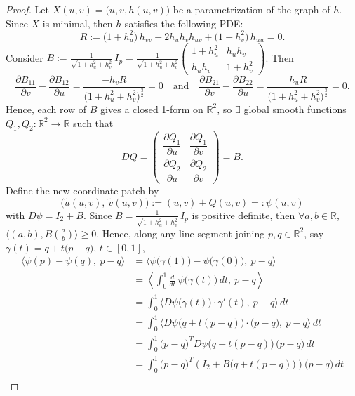 \begin{proof}
Let $X(u, v) = \big(u, v, h(u, v)\big)$ be a parametrization of the graph of $h$. Since $X$ is minimal, then $h$ satisfies the following PDE:
\[
R := \big(1 + h_u^2\big)\,h_{vv} - 2h_uh_vh_{uv} + \big(1 + h_v^2\big)\,h_{uu} = 0.
\]
Consider $B := \frac{1}{\sqrt{1 + h_u^2 + h_v^2}}\,I_p = \frac{1}{\sqrt{1 + h_u^2 + h_v^2}}\begin{pmatrix}1 + h_u^2 & h_uh_v\\ h_uh_v & 1 + h_v^2\end{pmatrix}$. Then
\[
\frac{\partial B_{11}}{\partial v} - \frac{\partial B_{12}}{\partial u} = \frac{-h_vR}{\big(1 + h_u^2 + h_v^2\big)^{\frac{3}{2}}} = 0 \quad\text{and}\quad \frac{\partial B_{21}}{\partial v} - \frac{\partial B_{22}}{\partial u} = \frac{h_uR}{\big(1 + h_u^2 + h_v^2\big)^{\frac{3}{2}}} = 0.
\]
Hence, each row of $B$ gives a closed 1-form on $\mathbb{R}^2$, so $\exists$ global smooth functions $Q_1, Q_2: \mathbb{R}^2\to\mathbb{R}$ such that
\[
DQ = \begin{pmatrix}\dfrac{\partial Q_1}{\partial u} & \dfrac{\partial Q_1}{\partial v}\\[3mm] \dfrac{\partial Q_2}{\partial u} & \dfrac{\partial Q_2}{\partial v}\end{pmatrix} = B.
\]
Define the new coordinate patch by
\[
\big(\tilde{u}(u, v),\ \tilde{v}(u, v)\big) := (u, v) + Q(u, v) =: \psi(u, v)
\]
with $D\psi = I_2 + B$. Since $B = \frac{1}{\sqrt{1 + h_u^2 + h_v^2}}\,I_p$ is positive definite, then $\forall a, b\in\mathbb{R}$, $\langle (a, b), B\binom{a}{b}\rangle\ge 0$. Hence, along any line segment joining $p, q\in\mathbb{R}^2$, say $\gamma(t) = q + t\big(p - q\big)$, $t\in[0, 1]$,
\begin{align*}
    \big\langle\psi(p) - \psi(q),\ p - q\big\rangle &= \Big\langle\psi\big(\gamma(1)\big) - \psi\big(\gamma(0)\big),\ p - q\Big\rangle\\
    &= \left\langle\int_0^1\frac{d}{dt}\,\psi\big(\gamma(t)\big)\,dt,\ p - q\right\rangle\\
    &= \int_0^1\Big\langle D\psi\big(\gamma(t)\big)\cdot\gamma'(t),\ p - q\Big\rangle\,dt\\
    &= \int_0^1\Big\langle D\psi\big(q + t(p - q)\big)\cdot\big(p - q\big),\ p - q\Big\rangle\,dt\\
    &= \int_0^1\big(p - q\big)^T D\psi\big(q + t(p - q)\big)\,\big(p - q\big)\,dt\\
    &= \int_0^1\big(p - q\big)^T\left(I_2 + B\big(q + t(p - q)\big)\right)\big(p - q\big)\,dt\\

\end{align*}
\end{proof}
